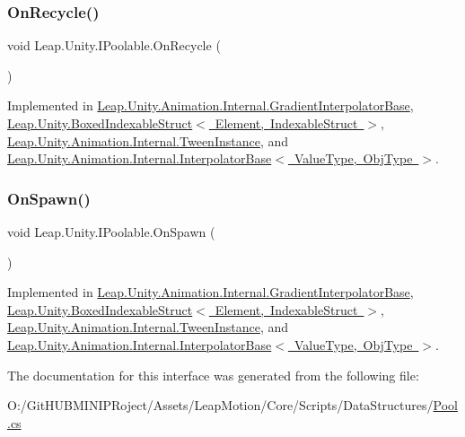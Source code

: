 \subsubsection{\texorpdfstring{OnRecycle()}{OnRecycle()}}
{\footnotesize\ttfamily void Leap.\+Unity.\+I\+Poolable.\+On\+Recycle (\begin{DoxyParamCaption}{ }\end{DoxyParamCaption})}



Implemented in \mbox{\hyperlink{class_leap_1_1_unity_1_1_animation_1_1_internal_1_1_gradient_interpolator_base_a4359819686a6c4def43967685c12f09c}{Leap.\+Unity.\+Animation.\+Internal.\+Gradient\+Interpolator\+Base}}, \mbox{\hyperlink{class_leap_1_1_unity_1_1_boxed_indexable_struct_aa8fe681e5cd7eb74d91af8fb2d950fe7}{Leap.\+Unity.\+Boxed\+Indexable\+Struct$<$ Element, Indexable\+Struct $>$}}, \mbox{\hyperlink{class_leap_1_1_unity_1_1_animation_1_1_internal_1_1_tween_instance_acbda036d82d4e18d0957b5f2a5506103}{Leap.\+Unity.\+Animation.\+Internal.\+Tween\+Instance}}, and \mbox{\hyperlink{class_leap_1_1_unity_1_1_animation_1_1_internal_1_1_interpolator_base_a2721fd11c2638b2f02792c3a73816346}{Leap.\+Unity.\+Animation.\+Internal.\+Interpolator\+Base$<$ Value\+Type, Obj\+Type $>$}}.

\mbox{\label{interface_leap_1_1_unity_1_1_i_poolable_af2e9cf2345aeddf586f7e86fa8301442}} 
\subsubsection{\texorpdfstring{OnSpawn()}{OnSpawn()}}
{\footnotesize\ttfamily void Leap.\+Unity.\+I\+Poolable.\+On\+Spawn (\begin{DoxyParamCaption}{ }\end{DoxyParamCaption})}



Implemented in \mbox{\hyperlink{class_leap_1_1_unity_1_1_animation_1_1_internal_1_1_gradient_interpolator_base_a51da8752a502f327aaaa8b9d91baf796}{Leap.\+Unity.\+Animation.\+Internal.\+Gradient\+Interpolator\+Base}}, \mbox{\hyperlink{class_leap_1_1_unity_1_1_boxed_indexable_struct_a3742788d7d9267dbb858f26da1129702}{Leap.\+Unity.\+Boxed\+Indexable\+Struct$<$ Element, Indexable\+Struct $>$}}, \mbox{\hyperlink{class_leap_1_1_unity_1_1_animation_1_1_internal_1_1_tween_instance_a39c988e26296542f98568605d17263f2}{Leap.\+Unity.\+Animation.\+Internal.\+Tween\+Instance}}, and \mbox{\hyperlink{class_leap_1_1_unity_1_1_animation_1_1_internal_1_1_interpolator_base_a41d605569ecfa9f2e9e708e452746b83}{Leap.\+Unity.\+Animation.\+Internal.\+Interpolator\+Base$<$ Value\+Type, Obj\+Type $>$}}.



The documentation for this interface was generated from the following file\+:\begin{DoxyCompactItemize}
\item 
O\+:/\+Git\+H\+U\+B\+M\+I\+N\+I\+P\+Roject/\+Assets/\+Leap\+Motion/\+Core/\+Scripts/\+Data\+Structures/\mbox{\hyperlink{_pool_8cs}{Pool.\+cs}}\end{DoxyCompactItemize}
